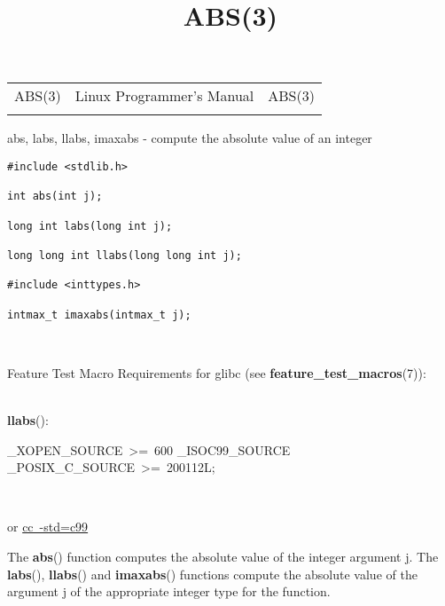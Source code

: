 \documentclass[]{article}
\title{ABS(3)}
\author{}
\date{}
\let\realtextbf=\textbf
\renewcommand{\textbf}[1]{\textcolor{boldcolor}{\realtextbf{#1}}}
\renewcommand{\emph}[1]{\underline{#1}}
\begin{document}
\maketitle

\begin{longtable}[c]{@{}lll@{}}
\toprule\addlinespace
ABS(3) & Linux Programmer's Manual & ABS(3)
\\\addlinespace
\bottomrule
\end{longtable}


abs, labs, llabs, imaxabs - compute the absolute value of an integer


\begin{verbatim}
#include <stdlib.h>
 
int abs(int j);
 
long int labs(long int j);
 
long long int llabs(long long int j);
 
#include <inttypes.h>
 
intmax_t imaxabs(intmax_t j);
\end{verbatim}

~

Feature Test Macro Requirements for glibc (see
\textbf{feature\_test\_macros}(7)): \\

~

\textbf{llabs}():

\_XOPEN\_SOURCE~\textgreater{}=~600 \textbar{}\textbar{}
\_ISOC99\_SOURCE \textbar{}\textbar{}
\_POSIX\_C\_SOURCE~\textgreater{}=~200112L;

~

or \emph{cc~-std=c99}


The \textbf{abs}() function computes the absolute value of the integer
argument \emph{j}. The \textbf{labs}(), \textbf{llabs}() and
\textbf{imaxabs}() functions compute the absolute value of the argument
\emph{j} of the appropriate integer type for the function.
\end{document}
